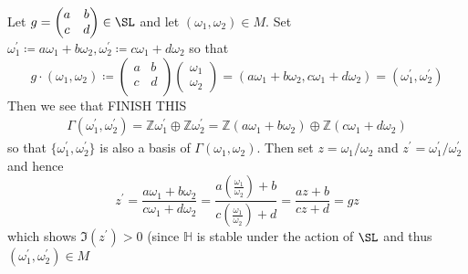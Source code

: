 \documentclass[12pt]{article}
\theoremstyle{definition}
\begin{document}
Let \(g = \begin{pmatrix}
    a &  b \\
    c &  d \\
\end{pmatrix} \in \SL\) and let \((\omega _1,\omega _2) \in M\). Set \( \omega_1^{\prime} \coloneqq a \omega _1 + b \omega _2,\omega_2^{\prime} \coloneqq c \omega _1 + d\omega _2 \) so that
\[
    g \cdot (\omega _1,\omega _2) \coloneqq \begin{pmatrix}
        a &  b \\
        c &  d \\
    \end{pmatrix}\begin{pmatrix}
         \omega_1 \\ \omega_2
    \end{pmatrix} = (a \omega _1 + b \omega _2 , c \omega _1 + d\omega _2) = (\omega_1^{\prime} ,\omega _2^{\prime} )
\]  
Then we see that FINISH THIS
\begin{align*}
    \Gamma (\omega _1^{\prime} ,\omega _2^{\prime} ) = \mathbb{Z} \omega _1^{\prime}  \oplus \mathbb{Z} \omega _2^{\prime}  = \mathbb{Z} (a \omega_1 + b \omega _2)  \oplus \mathbb{Z} (c \omega_1 + d \omega _2) 
\end{align*}
so that \(\{ \omega _1^{\prime} ,\omega _2^{\prime}  \} \) is also a basis of \(\Gamma (\omega _1, \omega _2)\). Then set \(z = \omega_1/\omega _2\) and \(z^{\prime} = \omega _1^{\prime} / \omega _2^{\prime} \) and hence
\[
    z^{\prime} = \frac{ a \omega _1 + b \omega _2 }{c \omega _1 + d\omega _2 } = \frac{a \left(\frac{\omega _1}{\omega _2}\right) + b }{ c \left(\frac{\omega _1}{\omega _2}\right) + d} = \frac{az+b}{cz+d} = gz
\]    
which shows \(\Im(z^{\prime} )>0\) (since \(\mathbb{H} \) is stable under the action of \(\SL\) and thus \((\omega _1^{\prime} ,\omega _2^{\prime} )\in M\) 
\end{document}
